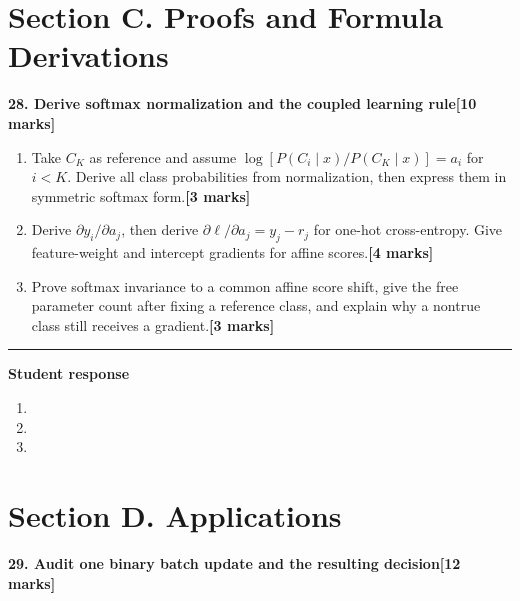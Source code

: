 \documentclass[11pt,a4paper]{article}
\newlength{\BlankAnswerHeight}\setlength{\BlankAnswerHeight}{16mm}
\newcommand{\AnswerBlank}{\leavevmode\par\vspace{\BlankAnswerHeight}}
\begin{document}
\newpage\section*{Section C. Proofs and Formula Derivations}
\textbf{28. Derive softmax normalization and the coupled learning rule}\hfill\textbf{[10 marks]}\par\medskip
\begin{enumerate}[label=(\alph*),leftmargin=8mm,itemsep=3pt]
\item Take \(C_K\) as reference and assume \(\log[P(C_i\mid x)/P(C_K\mid x)]=a_i\) for \(i<K\). Derive all class probabilities from normalization, then express them in symmetric softmax form.\hfill\textbf{[3 marks]}
\item Derive \(\partial y_i/\partial a_j\), then derive \(\partial\ell/\partial a_j=y_j-r_j\) for one-hot cross-entropy. Give feature-weight and intercept gradients for affine scores.\hfill\textbf{[4 marks]}
\item Prove softmax invariance to a common affine score shift, give the free parameter count after fixing a reference class, and explain why a nontrue class still receives a gradient.\hfill\textbf{[3 marks]}
\end{enumerate}\par\medskip\hrule\medskip\textbf{Student response}\par
\begin{enumerate}[label=(\alph*),leftmargin=8mm,itemsep=3pt]
\item
\AnswerBlank
\item
\AnswerBlank
\item
\AnswerBlank
\end{enumerate}
\newpage\section*{Section D. Applications}
\textbf{29. Audit one binary batch update and the resulting decision}\hfill\textbf{[12 marks]}\par\medskip
\end{document}
